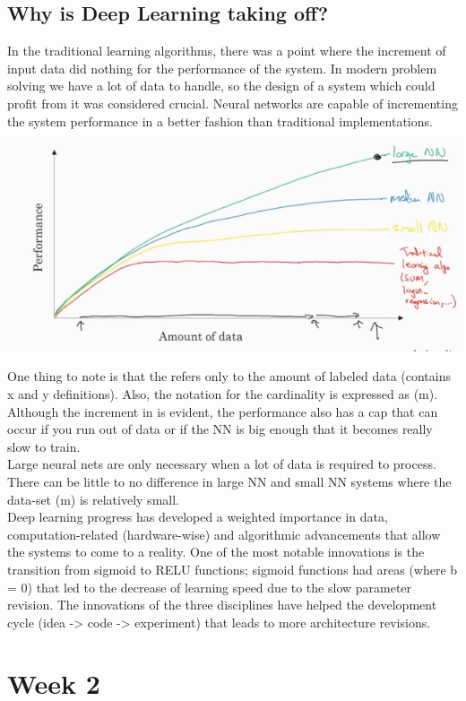\documentclass[11pt]{report}
\begin{document}
\subsection*{Why is Deep Learning taking off?}
In the traditional learning algorithms, there was a point where the increment of input data did nothing for the performance of the system. In modern problem solving we have a lot of data to handle, so the design of a system which could profit from it was considered crucial. Neural networks are capable of incrementing the system performance in a better fashion than traditional implementations. 
\begin{center}
	\includegraphics[width = .50\textwidth]{PRGR.png}
\end{center}
One thing to note is that the  refers only to the amount of labeled data (contains x and y definitions). Also, the notation for the cardinality is expressed as (m).\\
Although the increment in  is evident, the performance also has a cap that can occur if you run out of data or if the NN is big enough that it becomes really slow to train.\\
Large neural nets are only necessary when a lot of data is required to process. There can be little to no difference in large NN and small NN systems where the data-set (m) is relatively small.\\
Deep learning progress has developed a weighted importance in data, computation-related (hardware-wise) and algorithmic advancements that allow the systems to come to a reality. One of the most notable innovations is the transition from sigmoid to RELU functions; sigmoid functions had areas (where b = 0) that led to the decrease of learning speed due to the slow parameter revision. The innovations of the three disciplines have helped the development cycle (idea -> code -> experiment) that leads to more architecture revisions.

\section{Week 2}
\end{document}
